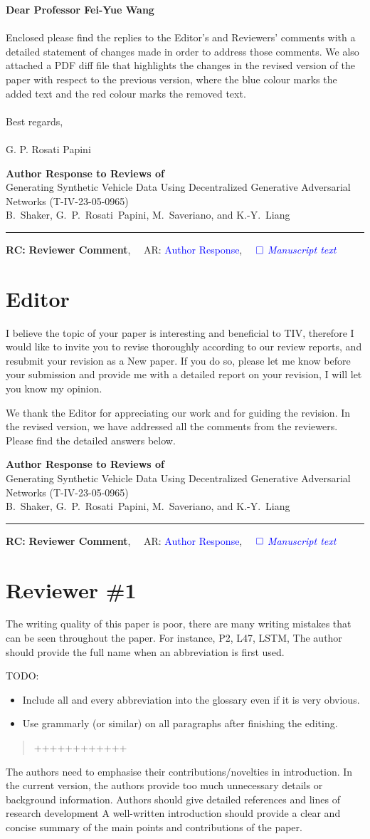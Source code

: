 \documentclass{article}
\def\papertitle{Generating Synthetic Vehicle Data Using Decentralized Generative Adversarial Networks (T-IV-23-05-0965)}
\def\authors{B.~Shaker, G.~P.~Rosati~Papini, M.~Saveriano, and K.-Y.~Liang}
\def\Editor{Dear Professor Fei-Yue Wang\\}
\def\Letter{Enclosed please find the replies to the Editor's and Reviewers' comments with a detailed statement of changes made in order to address those comments. We also attached a PDF diff file that highlights the changes in the revised version of the paper with respect to the previous version, where the blue colour marks the added text and the red colour marks the removed text.
	\\ \\
	Best regards,\\
	\\
	G. P. Rosati Papini
}
\providecommand{\lettertitle}{Author Response to Reviews of}
\providecommand{\papertitle}{Title}
\providecommand{\authors}{Authors}
\providecommand{\journal}{Journal}
\providecommand{\doi}{--}
\providecommand{\Editor}{Name}
\providecommand{\Letter}{Body}
\def\headall{
{\Large\bf \lettertitle}\\[1em]
{\Large \papertitle}\\[1em]
{\authors}\\
\hrule

\hfill {\bfseries RC:} \textbf{{Reviewer Comment}},\(\quad\) AR: \textcolor{blue}{Author Response}, \(\quad\textcolor{blue}{\square}\) \emph{\textcolor{blue}{Manuscript text}}}
\begin{document}
{\Large\bf \Editor}\\[1em]
{\large\Letter}\\[1em]
\newpage
\headall











\section{Editor}

\RC I believe the topic of your paper is interesting and beneficial to TIV, therefore I would like to invite you to revise thoroughly according to our review reports, and resubmit your revision as a New paper. If you do so, please let me know before your submission and provide me with a detailed report on your revision, I will let you know my opinion.

\AR We thank the Editor for appreciating our work and for guiding the revision. In the revised version, we have addressed all the comments from the reviewers. Please find the detailed answers below.




\newpage
\headall

\section{Reviewer \#1}

\RC The writing quality of this paper is poor, there are many writing mistakes that can be seen throughout the paper. For instance, P2, L47, LSTM, The author should provide the full name when an abbreviation is first used.

\AR TODO: 
\begin{itemize}
    \item Include all and every abbreviation into the glossary even if it is very obvious.
    \item Use grammarly (or similar) on all paragraphs after finishing the editing. 
\end{itemize}

\begin{quote}
	++++++++++++
\end{quote}

\RC The authors need to emphasise their contributions/novelties in introduction. In the current version, the authors provide too much unnecessary details or background information. Authors should give detailed references and lines of research development A well-written introduction should provide a clear and concise summary of the main points and contributions of the paper.
\end{document}
